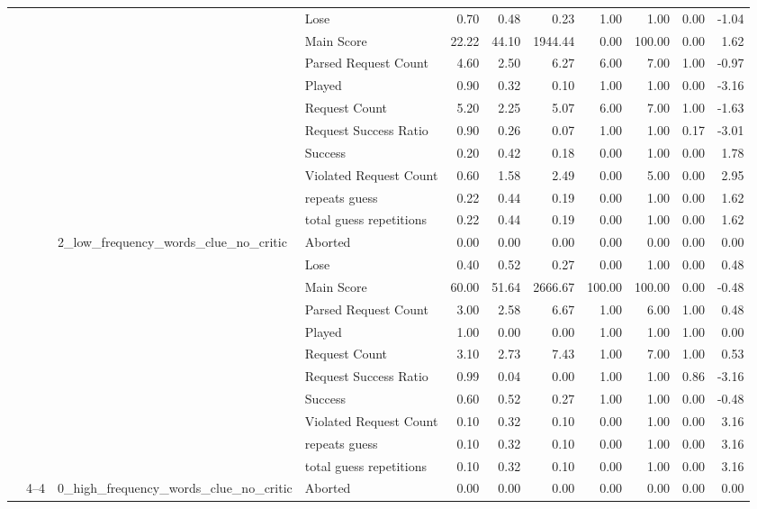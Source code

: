 \begin{tabular}{llllrrrrrrr}
 &  &  & Lose & 0.70 & 0.48 & 0.23 & 1.00 & 1.00 & 0.00 & -1.04 \\
 &  &  & Main Score & 22.22 & 44.10 & 1944.44 & 0.00 & 100.00 & 0.00 & 1.62 \\
 &  &  & Parsed Request Count & 4.60 & 2.50 & 6.27 & 6.00 & 7.00 & 1.00 & -0.97 \\
 &  &  & Played & 0.90 & 0.32 & 0.10 & 1.00 & 1.00 & 0.00 & -3.16 \\
 &  &  & Request Count & 5.20 & 2.25 & 5.07 & 6.00 & 7.00 & 1.00 & -1.63 \\
 &  &  & Request Success Ratio & 0.90 & 0.26 & 0.07 & 1.00 & 1.00 & 0.17 & -3.01 \\
 &  &  & Success & 0.20 & 0.42 & 0.18 & 0.00 & 1.00 & 0.00 & 1.78 \\
 &  &  & Violated Request Count & 0.60 & 1.58 & 2.49 & 0.00 & 5.00 & 0.00 & 2.95 \\
 &  &  & repeats guess & 0.22 & 0.44 & 0.19 & 0.00 & 1.00 & 0.00 & 1.62 \\
 &  &  & total guess repetitions & 0.22 & 0.44 & 0.19 & 0.00 & 1.00 & 0.00 & 1.62 \\
\cline{3-11}
 &  & \multirow[t]{11}{*}{2_low_frequency_words_clue_no_critic} & Aborted & 0.00 & 0.00 & 0.00 & 0.00 & 0.00 & 0.00 & 0.00 \\
 &  &  & Lose & 0.40 & 0.52 & 0.27 & 0.00 & 1.00 & 0.00 & 0.48 \\
 &  &  & Main Score & 60.00 & 51.64 & 2666.67 & 100.00 & 100.00 & 0.00 & -0.48 \\
 &  &  & Parsed Request Count & 3.00 & 2.58 & 6.67 & 1.00 & 6.00 & 1.00 & 0.48 \\
 &  &  & Played & 1.00 & 0.00 & 0.00 & 1.00 & 1.00 & 1.00 & 0.00 \\
 &  &  & Request Count & 3.10 & 2.73 & 7.43 & 1.00 & 7.00 & 1.00 & 0.53 \\
 &  &  & Request Success Ratio & 0.99 & 0.04 & 0.00 & 1.00 & 1.00 & 0.86 & -3.16 \\
 &  &  & Success & 0.60 & 0.52 & 0.27 & 1.00 & 1.00 & 0.00 & -0.48 \\
 &  &  & Violated Request Count & 0.10 & 0.32 & 0.10 & 0.00 & 1.00 & 0.00 & 3.16 \\
 &  &  & repeats guess & 0.10 & 0.32 & 0.10 & 0.00 & 1.00 & 0.00 & 3.16 \\
 &  &  & total guess repetitions & 0.10 & 0.32 & 0.10 & 0.00 & 1.00 & 0.00 & 3.16 \\
\cline{2-11} \cline{3-11}
 & \multirow[t]{33}{*}{4--4} & \multirow[t]{11}{*}{0_high_frequency_words_clue_no_critic} & Aborted & 0.00 & 0.00 & 0.00 & 0.00 & 0.00 & 0.00 & 0.00 \\

\end{tabular}
